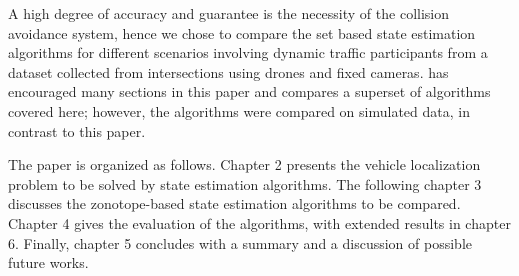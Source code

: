 A high degree of accuracy and guarantee is the necessity of the collision avoidance system, hence we chose to compare the set based state estimation algorithms for different scenarios involving dynamic traffic participants from a dataset collected from intersections using drones and fixed cameras. \cite{Rath} has encouraged many sections in this paper and compares a superset of algorithms covered here; however, the algorithms were compared on simulated data, in contrast to this paper.

The paper is organized as follows. Chapter 2 presents the vehicle localization problem to be solved by state estimation algorithms. The following chapter 3 discusses the zonotope-based state estimation algorithms to be compared. Chapter 4 gives the evaluation of the algorithms, with extended results in chapter 6. Finally, chapter 5 concludes with a summary and a discussion of possible future works.




